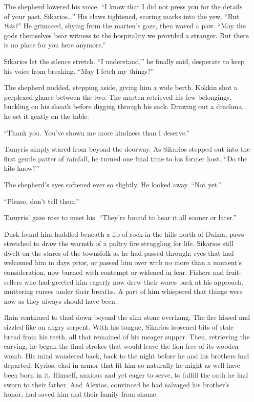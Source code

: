 The shepherd lowered his voice. ``I know that I did not press you for the details of your past, Sikarios\ldots'' His claws tightened, scoring marks into the yew. ``But \emph{this?}'' He grimaced, shying from the marten's gaze, then waved a paw. ``May the gods themselves bear witness to the hospitality we provided a stranger. But there is no place for you here anymore.''

Sikarios let the silence stretch. ``I understand,'' he finally said, desperate to keep his voice from breaking. ``May I fetch my things?''

The shepherd nodded, stepping aside, giving him a wide berth. Kokkin shot a perplexed glance between the two. The marten retrieved his few belongings, buckling on his sheath before digging through his sack. Drawing out a drachma, he set it gently on the table.

``Thank you. You've shown me more kindness than I deserve.''

Tamyris simply stared from beyond the doorway. As Sikarios stepped out into the first gentle patter of rainfall, he turned one final time to his former host. ``Do the kits know?''

The shepherd's eyes softened ever so slightly. He looked away. ``Not yet.''

``Please, don't tell them.''

Tamyris' gaze rose to meet his. ``They're bound to hear it all sooner or later.''

\secdiv

\noindent Dusk found him huddled beneath a lip of rock in the hills north of Dalma, paws stretched to draw the warmth of a paltry fire struggling for life. Sikarios still dwelt on the stares of the townsfolk as he had passed through; eyes that had welcomed him in days prior, or passed him over with no more than a moment's consideration, now burned with contempt or widened in fear. Fishers and fruit-sellers who had greeted him eagerly now drew their wares back at his approach, muttering curses under their breaths. A part of him whispered that things were now as they always should have been.

Rain continued to thud down beyond the slim stone overhang. The fire hissed and sizzled like an angry serpent. With his tongue, Sikarios loosened bits of stale bread from his teeth, all that remained of his meager supper. Then, retrieving the carving, he began the final strokes that would leave the lion free of its wooden womb. His mind wandered back, back to the night before he and his brothers had departed. Kyrios, clad in armor that fit him so naturally he might as well have been born in it. Himself, anxious and yet eager to serve, to fulfill the oath he had sworn to their father. And Alexios, convinced he had salvaged his brother's honor, had saved him and their family from shame.

